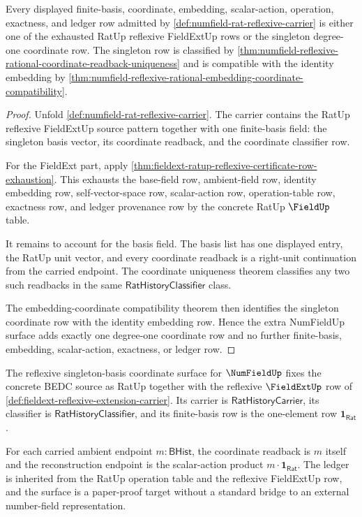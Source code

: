 \begin{theorem}
\label{thm:numfield-reflexive-rational-degree-one-row-exhaustion}
Every displayed finite-basis, coordinate, embedding, scalar-action, operation,
exactness, and ledger row admitted by
\autoref{def:numfield-rat-reflexive-carrier} is either one of the exhausted
RatUp reflexive FieldExtUp rows or the singleton degree-one coordinate row.
The singleton row is classified by
\autoref{thm:numfield-reflexive-rational-coordinate-readback-uniqueness} and
is compatible with the identity embedding by
\autoref{thm:numfield-reflexive-rational-embedding-coordinate-compatibility}.
\end{theorem}
\begin{proof}
Unfold \autoref{def:numfield-rat-reflexive-carrier}. The carrier contains the
RatUp reflexive FieldExtUp source pattern together with one finite-basis
field: the singleton basis vector, its coordinate readback, and the
coordinate classifier row.

For the FieldExt part, apply
\autoref{thm:fieldext-ratup-reflexive-certificate-row-exhaustion}. This
exhausts the base-field row, ambient-field row, identity embedding row,
self-vector-space row, scalar-action row, operation-table row, exactness row,
and ledger provenance row by the concrete RatUp $\FieldUp$ table.

It remains to account for the basis field. The basis list has one displayed
entry, the RatUp unit vector, and every coordinate readback is a right-unit
continuation from the carried endpoint. The coordinate uniqueness theorem
classifies any two such readbacks in the same
$\mathsf{RatHistoryClassifier}$ class.

The embedding-coordinate compatibility theorem then identifies the singleton
coordinate row with the identity embedding row. Hence the extra NumFieldUp
surface adds exactly one degree-one coordinate row and no further
finite-basis, embedding, scalar-action, exactness, or ledger row.
\end{proof}

\begin{definition}
\label{def:numfield-reflexive-singleton-basis-coordinate-surface}
The reflexive singleton-basis coordinate surface for $\NumFieldUp$ fixes the
concrete BEDC source as RatUp together with the reflexive $\FieldExtUp$ row of
\autoref{def:fieldext-reflexive-extension-carrier}. Its carrier is
$\mathsf{RatHistoryCarrier}$, its classifier is
$\mathsf{RatHistoryClassifier}$, and its finite-basis row is the one-element
row $\mathbf{1}_{\mathsf{Rat}}$.

For each carried ambient endpoint $m:\mathsf{BHist}$, the coordinate readback
is $m$ itself and the reconstruction endpoint is the scalar-action product
$m\cdot\mathbf{1}_{\mathsf{Rat}}$. The ledger is inherited from the RatUp
operation table and the reflexive FieldExtUp row, and the surface is a
paper-proof target without a standard bridge to an external number-field
representation.
\end{definition}


